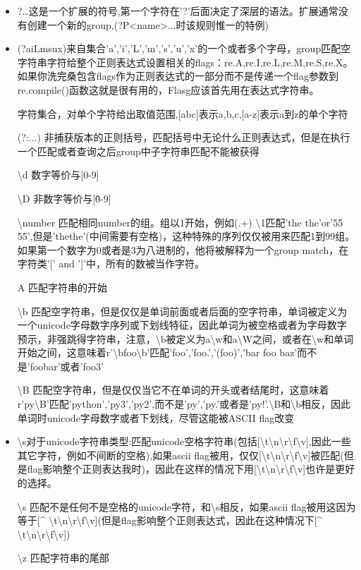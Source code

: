 \begin{itemize}
\item ?\ldots 这是一个扩展的符号,第一个字符在'?'后面决定了深层的语法。扩展通常没有创建一个新的group,(?P<name>$\ldots$时该规则惟一的特例)
\item (?aiLmsux)来自集合'a','i','L','m','s','u','x'的一个或者多个字母，group匹配空字符串字符给整个正则表达式设置相关的flags：re.A,re.I,re.L,re.M,re.S,re.X。如果你洗完桑包含flags作为正则表达式的一部分而不是传递一个flag参数到re.compile()函数这就是很有用的，Flasg应该首先用在表达式字符串。
\item [ ]字符集合，对单个字符给出取值范围,[abc]表示a,b,c,[a-z]表示a到z的单个字符
\item [(?:...)] 非捕获版本的正则括号，匹配括号中无论什么正则表达式，但是在执行一个匹配或者查询之后group中子字符串匹配不能被获得
\item[\textbackslash d] 数字等价与[0-9]
 \item[\textbackslash D] 非数字等价与[\^0-9]
 \item[\textbackslash number] 匹配相同number的组。组以1开始，例如(.+) \textbackslash1匹配'the the'or'55 55',但是'thethe'(中间需要有空格)，这种特殊的序列仅仅被用来匹配1到99组。如果第一个数字为0或者是3为八进制的，他将被解释为一个group match，在字符类'[' and ']'中，所有的数被当作字符。
 \item[A] 匹配字符串的开始
 \item[\textbackslash b] 匹配空字符串，但是仅仅是单词前面或者后面的空字符串，单词被定义为一个unicode字母数字序列或下划线特征，因此单词为被空格或者为字母数字预示，非强跳得字符串，注意，\textbackslash b被定义为a\textbackslash w和a\textbackslash W之间，或者在\textbackslash w和单词开始之间，这意味着r'\textbackslash bfoo\textbackslash b'匹配'foo','foo.','(foo)','bar foo baz'而不是'foobar'或者'foo3'
 \item[\textbackslash B]匹配空字符串，但是仅仅当它不在单词的开头或者结尾时，这意味着r'py\textbackslash B'匹配'python','py3','py2',而不是'py','py.'或者是'py!'.\textbackslash B和\textbackslash b相反，因此单词时unicode字母数字或者下划线，尽管这能被ASCII flag改变
 \item \textbackslash s对于unicode字符串类型:匹配unicode空格字符串(包括[\textbackslash t\textbackslash n\textbackslash r\textbackslash f\textbackslash v],因此一些其它字符，例如不间断的空格),如果ascii flag被用，仅仅[\textbackslash t\textbackslash n\textbackslash r\textbackslash f\textbackslash v]被匹配(但是flag影响整个正则表达我时)，因此在这样的情况下用[\textbackslash t\textbackslash n\textbackslash r\textbackslash f\textbackslash v]也许是更好的选择。
 \item[\textbackslash s] 匹配不是任何不是空格的unicode字符，和\textbackslash s相反，如果ascii flag被用这因为等于[\^{} \textbackslash t\textbackslash n\textbackslash r\textbackslash f\textbackslash v](但是flag影响整个正则表达式，因此在这种情况下[\^{} \textbackslash t\textbackslash n\textbackslash r\textbackslash f\textbackslash v])
\item [\textbackslash z]匹配字符串的尾部
\end{itemize}
\newpage

